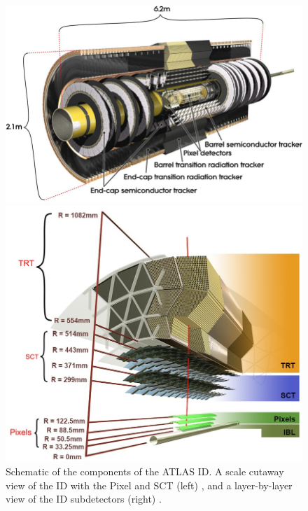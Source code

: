 \begin{figure}[!thp]
    \begin{minipage}[c]{.53\textwidth}
        \includegraphics[width=\textwidth]{chapters/chapter2_experiment/images/id_slice.png}
    \end{minipage}
    \begin{minipage}[c]{.45\textwidth}
        \includegraphics[width=\textwidth]{chapters/chapter2_experiment/images/id_layer.png} 
    \end{minipage}
    \caption[Schematic of the components of the ATLAS \gls{ID}]{Schematic of the components of the ATLAS \gls{ID}. A scale cutaway view of the \gls{ID} with the Pixel and \gls{SCT} (left) \cite{pixel-electronics}, and a layer-by-layer view of the \gls{ID} subdetectors (right) \cite{id-perf2015}.}
\end{figure}
    

